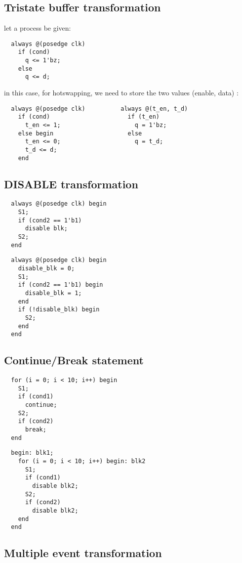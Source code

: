 \documentclass{note}
\begin{document}
\subsection{Tristate buffer transformation}
\bit
\w let a process be given:
  \begin{verbatim}
  always @(posedge clk) 
    if (cond)
      q <= 1'bz;
    else
      q <= d;
  \end{verbatim}
  in this case, for hotswapping, we need to store the two values (enable, data)
\w {}:
  \begin{verbatim}
  always @(posedge clk)          always @(t_en, t_d)
    if (cond)                      if (t_en)
      t_en <= 1;                     q = 1'bz;
    else begin                     else
      t_en <= 0;                     q = t_d;
      t_d <= d;
    end
  \end{verbatim}
   
\eit

\subsection{DISABLE transformation}
\begin{verbatim}
  always @(posedge clk) begin
    S1;
    if (cond2 == 1'b1) 
      disable blk;
    S2;
  end  
\end{verbatim}

\begin{verbatim}
  always @(posedge clk) begin
    disable_blk = 0;
    S1;
    if (cond2 == 1'b1) begin
      disable_blk = 1;
    end
    if (!disable_blk) begin
      S2;
    end
  end  
\end{verbatim}


\subsection{Continue/Break statement}
\begin{verbatim}
  for (i = 0; i < 10; i++) begin
    S1;
    if (cond1)
      continue;
    S2;
    if (cond2)
      break;
  end
\end{verbatim}

\begin{verbatim}
  begin: blk1;
    for (i = 0; i < 10; i++) begin: blk2
      S1;
      if (cond1)
        disable blk2;
      S2;
      if (cond2)
        disable blk2;
    end
  end
\end{verbatim}

\subsection{Multiple event transformation}
\end{document}
